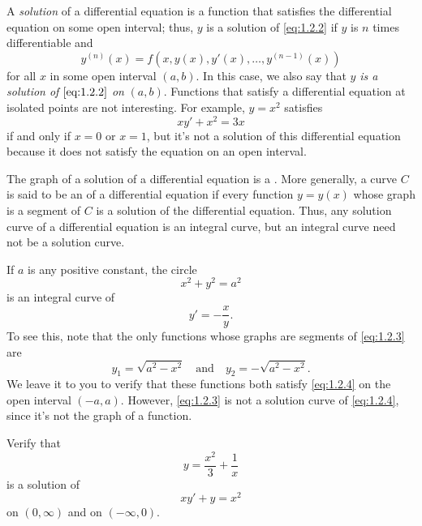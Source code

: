 A \emph{\color{blue}solution} of a differential equation is a function that
satisfies the differential equation on some open interval;   thus, $y$
is a solution of \eqref{eq:1.2.2} if $y$ is $n$ times differentiable and
\[
y^{(n)}(x)=f(x,y(x),y'(x), \dots,y^{(n-1)}(x))
\]
for all $x$ in some open interval $(a,b)$. In this case, we also say
that $y$ \emph{\color{blue}is a solution of $\eqref{eq:1.2.2}$ on} $(a,b)$. Functions
that satisfy a differential equation at isolated points are not
interesting. For example, $y=x^2$ satisfies
\[
xy'+x^2=3x
\]
if and only if $x=0$ or $x=1$, but it's not a solution of this
differential equation because it does not satisfy the equation on an
open interval.

The graph of a solution of a differential equation is  a
.
More generally, a curve $C$ is said to be an
 of a differential equation
if every function
$y=y(x)$ whose graph is a segment of $C$ is a solution of the
differential equation. Thus, any solution curve of a differential
equation is an integral curve, but an integral curve need not be a
solution curve.

\begin{example}\label{example:1.2.1}
If $a$ is any positive constant,  the circle
\begin{equation} \label{eq:1.2.3}
x^2+y^2=a^2
\end{equation}
is an integral curve of
\begin{equation} \label{eq:1.2.4}
y'=-\frac{x}{y}.
\end{equation}
To see this, note that the only functions whose graphs are segments of
\eqref{eq:1.2.3} are
\[
y_1=\sqrt{a^2-x^2}\quad\text{and}\quad  y_2=-\sqrt{a^2-x^2}.
\]
We leave it to you to verify that these functions both satisfy
\eqref{eq:1.2.4} on the open interval $(-a,a)$. However, \eqref{eq:1.2.3} is
not a solution
curve of \eqref{eq:1.2.4}, since it's not the graph of a function.
\end{example}

\begin{example}\label{example:1.2.2}
Verify that
\begin{equation} \label{eq:1.2.5}
y=\frac{x^2}{3}+\frac{1}{x}
\end{equation}
is a solution of
\begin{equation} \label{eq:1.2.6}
xy'+y=x^2
\end{equation}
 on $(0,\infty)$ and on $(-\infty,0)$.
\end{example}


